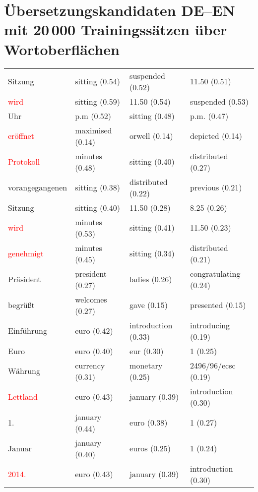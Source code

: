 \documentclass[11pt,twoside,openright]{mpreport}
\begin{document}
\section{Übersetzungskandidaten DE--EN mit 20\,000 Trainingssätzen über Wortoberflächen}
\label{sec:evalDeEn10kSurf}
\hspace{-4cm}\begin{scriptsize}\begin{tabular}{|llll|}
\hline
Sitzung                 & sitting (0.54) & suspended (0.52) & 11.50 (0.51) \\ %
\textcolor{red}{wird}                    & sitting (0.59) & 11.50 (0.54) & suspended (0.53) \\
Uhr                     & p.m (0.52) & sitting (0.48) & p.m. (0.47) \\ %
\textcolor{red}{eröffnet}               & maximised (0.14) & orwell (0.14) & depicted (0.14) \\
\textcolor{red}{Protokoll}               & minutes (0.48) & sitting (0.40) & distributed (0.27) \\
vorangegangenen         & sitting (0.38) & distributed (0.22) & previous (0.21) \\ %
Sitzung                 & sitting (0.40) & 11.50 (0.28) & 8.25 (0.26) \\ %
\textcolor{red}{wird}                    & minutes (0.53) & sitting (0.41) & 11.50 (0.23) \\
\textcolor{red}{genehmigt}               & minutes (0.45) & sitting (0.34) & distributed (0.21) \\
Präsident              & president (0.27) & ladies (0.26) & congratulating (0.24) \\ %
begrüßt               & welcomes (0.27) & gave (0.15) & presented (0.15) \\ %
Einführung             & euro (0.42) & introduction (0.33) & introducing (0.19) \\ %
Euro                    & euro (0.40) & eur (0.30) & 1 (0.25) \\ %
Währung                & currency (0.31) & monetary (0.25) & 2496/96/ecsc (0.19) \\ %
\textcolor{red}{Lettland}                & euro (0.43) & january (0.39) & introduction (0.30) \\
1.                      & january (0.44) & euro (0.38) & 1 (0.27) \\ %
Januar                  & january (0.40) & euros (0.25) & 1 (0.24) \\ %
\textcolor{red}{2014.}                   & euro (0.43) & january (0.39) & introduction (0.30) \\

\end{tabular}
\end{scriptsize}
\end{document}
